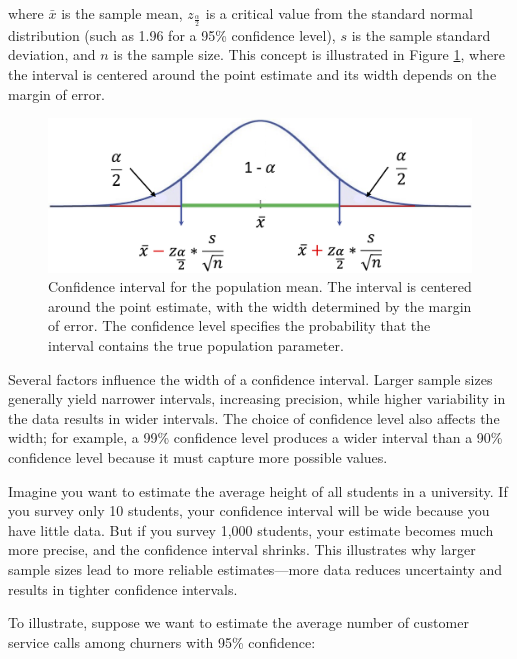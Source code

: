 \documentclass[
  11pt,
]{book}
\theoremstyle{definition}
\theoremstyle{definition}
\theoremstyle{definition}
\theoremstyle{definition}
\theoremstyle{remark}
\begin{document}
where \(\bar{x}\) is the sample mean, \(z_{\frac{\alpha}{2}}\) is a critical value from the standard normal distribution (such as 1.96 for a 95\% confidence level), \(s\) is the sample standard deviation, and \(n\) is the sample size. This concept is illustrated in Figure \ref{fig:confidence-interval}, where the interval is centered around the point estimate and its width depends on the margin of error.

\begin{figure}[H]

{\centering \includegraphics[width=0.8\linewidth]{images/ch5_confidence_interval} 

}

\caption{Confidence interval for the population mean. The interval is centered around the point estimate, with the width determined by the margin of error. The confidence level specifies the probability that the interval contains the true population parameter.}\label{fig:confidence-interval}
\end{figure}

Several factors influence the width of a confidence interval. Larger sample sizes generally yield narrower intervals, increasing precision, while higher variability in the data results in wider intervals. The choice of confidence level also affects the width; for example, a 99\% confidence level produces a wider interval than a 90\% confidence level because it must capture more possible values.

Imagine you want to estimate the average height of all students in a university. If you survey only 10 students, your confidence interval will be wide because you have little data. But if you survey 1,000 students, your estimate becomes much more precise, and the confidence interval shrinks. This illustrates why larger sample sizes lead to more reliable estimates---more data reduces uncertainty and results in tighter confidence intervals.

To illustrate, suppose we want to estimate the average number of customer service calls among churners with 95\% confidence:
\end{document}
